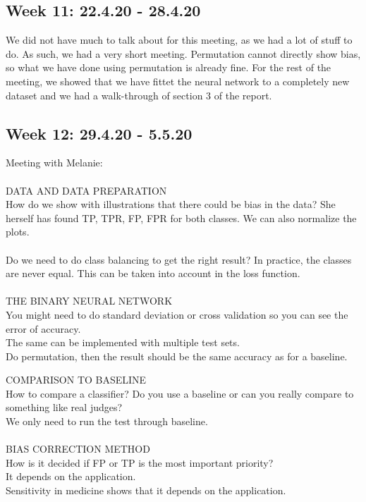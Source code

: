 \documentclass[11pt, fleqn]{article}
\begin{document}
\subsection*{Week 11: 22.4.20 - 28.4.20}
We did not have much to talk about for this meeting, as we had a lot of stuff to do. As such, we had a very short meeting. Permutation cannot directly show bias, so what we have done using permutation is already fine. For the rest of the meeting, we showed that we have fittet the neural network to a completely new dataset and we had a walk-through of section 3 of the report.

\subsection*{Week 12: 29.4.20 - 5.5.20}
\noindent Meeting with Melanie:\\\\

\noindent DATA AND DATA PREPARATION\\
\noindent How do we show with illustrations that there could be bias in the data?
\noindent She herself has found TP, TPR, FP, FPR for both classes. We can also normalize the plots.\\\\

\noindent Do we need to do class balancing to get the right result?
\noindent In practice, the classes are never equal. This can be taken into account in the loss function.\\\\

\noindent THE BINARY NEURAL NETWORK\\
\noindent You might need to do standard deviation or cross validation so you can see the error of accuracy.\\
\noindent The same can be implemented with multiple test sets.\\
\noindent Do permutation, then the result should be the same accuracy as for a baseline.

\noindent COMPARISON TO BASELINE\\
\noindent How to compare a classifier? Do you use a baseline or can you really compare to something like real judges?\\
\noindent We only need to run the test through baseline.\\\\


\noindent BIAS CORRECTION METHOD\\
\noindent How is it decided if FP or TP is the most important priority?\\
\noindent It depends on the application.\\
\noindent Sensitivity in medicine shows that it depends on the application.\\\\
\end{document}
